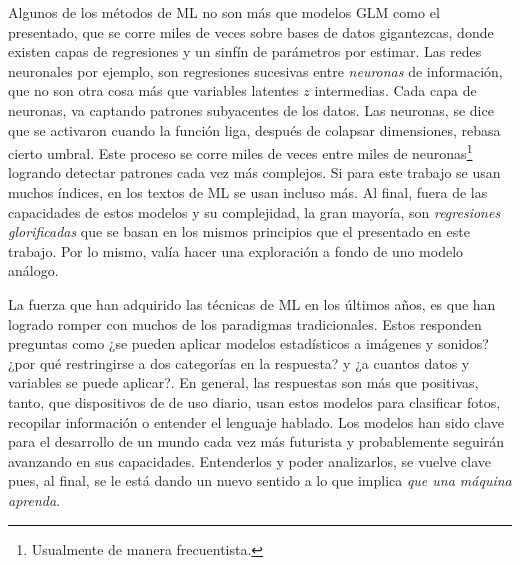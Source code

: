 \documentclass[../Main/Main.tex]{subfiles}
\begin{document}
Algunos de los métodos de ML no son más que modelos GLM como el presentado, que se corre miles de veces sobre bases de datos gigantezcas, donde existen capas de regresiones y un sinfín de parámetros por estimar. Las redes neuronales por ejemplo, son regresiones sucesivas entre \textit{neuronas} de información, que no son otra cosa más que variables latentes $z$ intermedias. Cada capa de neuronas, va captando patrones subyacentes de los datos. Las neuronas, se dice que se activaron cuando la función liga, después de colapsar dimensiones, rebasa cierto umbral. Este proceso se corre miles de veces entre miles de neuronas\footnote{Usualmente de manera frecuentista.} logrando detectar patrones cada vez más complejos. Si para este trabajo se usan muchos índices, en los textos de ML se usan incluso más. Al final, fuera de las capacidades de estos modelos y su complejidad, la gran mayoría, son \textit{regresiones glorificadas} que se basan en los mismos principios que el presentado en este trabajo. Por lo mismo, valía hacer una exploración a fondo de uno modelo análogo.

La fuerza que han adquirido las técnicas de ML en los últimos años, es que han logrado romper con muchos de los paradigmas tradicionales. Estos responden preguntas como ¿se pueden aplicar modelos estadísticos a imágenes y sonidos? ¿por qué restringirse a dos categorías en la respuesta? y ¿a cuantos datos y variables se puede aplicar?. En general, las respuestas son más que positivas, tanto, que dispositivos de de uso diario, usan estos modelos para clasificar fotos, recopilar información o entender el lenguaje hablado. Los modelos han sido clave para el desarrollo de un mundo cada vez más futurista y probablemente seguirán avanzando en sus capacidades. Entenderlos y poder analizarlos, se vuelve clave  pues, al final, se le está dando un nuevo sentido a lo que implica \textit{que una máquina aprenda}.
\end{document}
